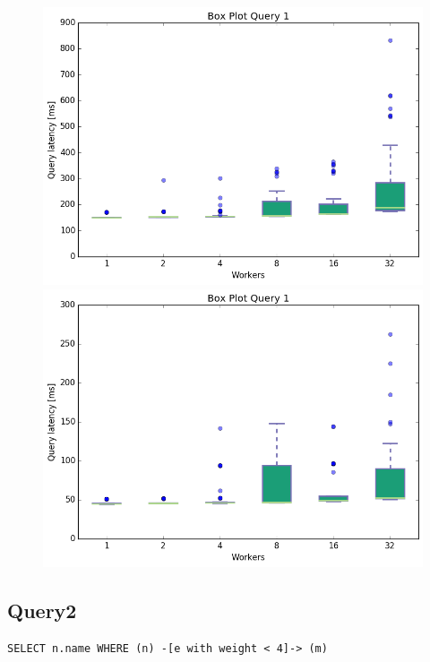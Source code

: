 \documentclass[11pt,singlecolumn]{scrartcl}
\begin{document}
\begin{figure}[!tbp]
  \centering
  \RawFloats
  \begin{minipage}[b]{0.5\textwidth}
    \includegraphics[width=\textwidth]{boxesjl/q1}
  \end{minipage}
  \hfill
  \begin{minipage}[b]{0.5\textwidth}
    \includegraphics[width=\textwidth]{boxesjs/q1}
  \end{minipage}
\end{figure}
\clearpage
\subsection{Query2}
\begin{verbatim}
SELECT n.name WHERE (n) -[e with weight < 4]-> (m)\end{verbatim}
\end{document}
